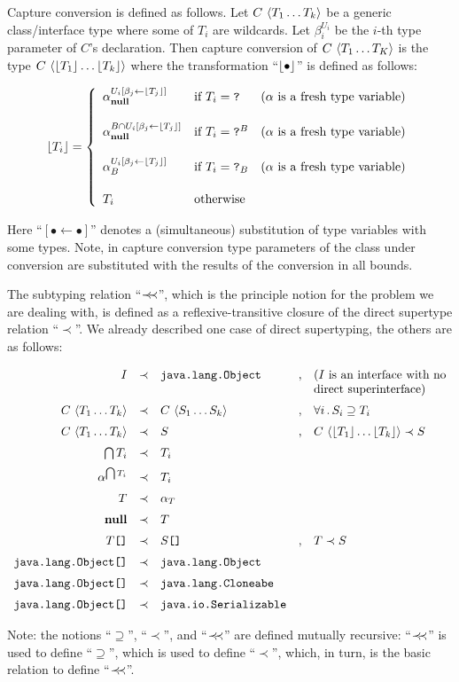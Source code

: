 Capture conversion is defined as follows. Let ${C}\,\left<{T_1\dots T_k}\right>$ be a generic class/interface type where some of $T_i$ are wildcards. Let
$\beta_i^{U_i}$ be the $i$-th type parameter of $C$'s declaration. Then capture conversion of
${C}\,\left<{T_1\dots T_K}\right>$ is the type ${C}\,\left<{\lfloor{T_1}\rfloor\dots \lfloor{T_k}\rfloor}\right>$ where the transformation
``$\lfloor{\bullet}\rfloor$'' is defined as follows:

\[
\lfloor{T_i}\rfloor=\left\{
\begin{array}{lll}  
  \alpha^{U_i[\beta_j\gets \lfloor{T_j}\rfloor]}_{\mathbf{null}}      &\mbox{if }        T_i=\texttt{?}  &\mbox{($\alpha$ is a fresh type variable)}\\[5mm]
  \alpha^{B\cap U_i[\beta_j\gets \lfloor{T_j}\rfloor]}_{\mathbf{null}} &\mbox{if }        T_i=\texttt{?}^B &\mbox{($\alpha$ is a fresh type variable)}\\[5mm]
  \alpha^{U_i[\beta_j\gets \lfloor{T_j}\rfloor]}_B               &\mbox{if }        T_i=\texttt{?}_B &\mbox{($\alpha$ is a fresh type variable)}\\[5mm]
  T_i                                           &\mbox{otherwise}  & 
\end{array}\right.
\]

Here ``$[\bullet\gets\bullet]$'' denotes a (simultaneous) substitution of type variables with some types. Note, in capture conversion
type parameters of the class under conversion are substituted with the results of the conversion in all bounds.

The subtyping relation ``$\prec\mathrel{\mkern-5mu}\prec$'', which is the principle notion for the problem we are dealing with, is defined as a reflexive-transitive
closure of the direct supertype relation ``$\prec$''. We already described one case of direct supertyping, the others are as follows:

\[
\begin{array}{rclcl}
  I & \prec & \texttt{java.lang.Object} &,& \mbox{($I$ is an interface with no}\\
    &       &                         & &\mbox{direct superinterface)}\\[2mm]
  {C}\,\left<{T_1\dots T_k}\right> & \prec & {C}\,\left<{S_1\dots S_k}\right> &,& \forall i\, .\, S_i\supseteq T_i\\[2mm]
  {C}\,\left<{T_1\dots T_k}\right> & \prec & S &,& {C}\,\left<{\lfloor{T_1}\rfloor\dots \lfloor{T_k}\rfloor}\right>\prec S\\[2mm]
  \bigcap T_i & \prec & T_i && \\[2mm]
  \alpha^{\bigcap T_i} & \prec & T_i &&\\[2mm]
  T & \prec & \alpha_T && \\[2mm]
  \mathbf{null} & \prec & T &&\\[2mm]
  T\texttt{[]} & \prec & S\texttt{[]} &,& T\prec S\\[2mm]
  \texttt{java.lang.Object[]} & \prec & \texttt{java.lang.Object} &&  \\[2mm]
  \texttt{java.lang.Object[]} & \prec & \texttt{java.lang.Cloneabe} && \\[2mm]
  \texttt{java.lang.Object[]} & \prec & \texttt{java.io.Serializable} &&
\end{array}
\]

Note: the notions ``$\supseteq$'', ``$\prec$'', and ``$\prec\mathrel{\mkern-5mu}\prec$'' are defined mutually recursive: ``$\prec\mathrel{\mkern-5mu}\prec$'' is used
to define ``$\supseteq$'', which is used to define ``$\prec$'', which, in turn, is the basic relation to define ``$\prec\mathrel{\mkern-5mu}\prec$''.
